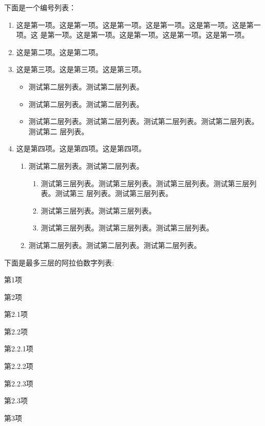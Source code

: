\documentclass[phd]{jnuthesis}
\begin{document}
下面是一个编号列表：

\begin{enumerate}
\item 这是第一项。这是第一项。这是第一项。这是第一项。这是第一项。这是第一项。这
  是第一项。这是第一项。这是第一项。这是第一项。这是第一项。
\item 这是第二项。这是第二项。
\item 这是第三项。这是第三项。这是第三项。
  \begin{itemize}
  \item 测试第二层列表。测试第二层列表。
  \item 测试第二层列表。测试第二层列表。
  \item 测试第二层列表。测试第二层列表。测试第二层列表。测试第二层列表。测试第二
    层列表。
  \end{itemize}
\item 这是第四项。这是第四项。这是第四项。
  \begin{enumerate}
  \item 测试第二层列表。测试第二层列表。
  \begin{enumerate}
  \item 测试第三层列表。测试第三层列表。测试第三层列表。测试第三层列表。测试第三
    层列表。测试第三层列表。
  \item 测试第三层列表。测试第三层列表。
  \item 测试第三层列表。测试第三层列表。测试第三层列表。
  \end{enumerate}
  \item 测试第二层列表。测试第二层列表。测试第二层列表。
  \end{enumerate}
\end{enumerate}

下面是最多三层的阿拉伯数字列表:
\begin{arabicenum}
\item 第1项
\item 第2项
  \begin{arabicenum}
  \item 第2.1项
  \item 第2.2项
    \begin{arabicenum}
    \item 第2.2.1项
    \item 第2.2.2项
    \item 第2.2.3项
    \end{arabicenum}
  \item 第2.3项
  \end{arabicenum}
\item 第3项
\end{arabicenum}
\end{document}
